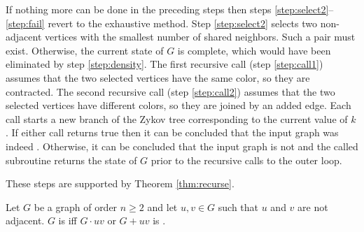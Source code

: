 If nothing more can be done in the preceding steps then steps \ref{step:select2}--\ref{step:fail} revert to the
exhaustive method.  Step \ref{step:select2} selects two non-adjacent vertices with the smallest number of shared
neighbors.  Such a pair must exist.  Otherwise, the current state of \(G\) is complete, which would have been
eliminated by step \ref{step:density}.  The first recursive call (step \ref{step:call1}) assumes that the two
selected vertices have the same color, so they are contracted.  The second recursive call (step \ref{step:call2})
assumes that the two selected vertices have different colors, so they are joined by an added edge.  Each call
starts a new branch of the Zykov tree corresponding to the current value of \(k\).  If either call returns true
then it can be concluded that the input graph was indeed .  Otherwise, it can be concluded that the
input graph is not  and the called subroutine returns the state of \(G\) prior to the recursive calls
to the outer loop.

These steps are supported by Theorem \ref{thm:recurse}.

\begin{theorem}
  \label{thm:recurse}
  Let \(G\) be a graph of order \(n\ge2\) and let \(u,v\in G\) such that \(u\) and \(v\) are not adjacent.  \(G\) is
   iff \(G\cdot uv\) or \(G+uv\) is .
\end{theorem}

